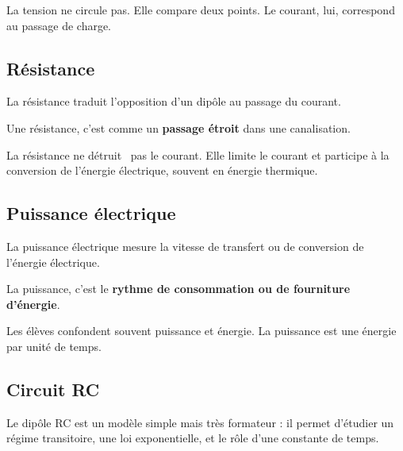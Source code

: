 \documentclass[11pt,a4paper]{article}
\begin{document}
\begin{fausseintuition}
La tension ne circule pas.
Elle compare deux points.
Le courant, lui, correspond au passage de charge.
\end{fausseintuition}

\subsection{Résistance}

\begin{sens}
La résistance traduit l'opposition d'un dipôle au passage du courant.
\end{sens}

\begin{imagem}
Une résistance, c'est comme un \textbf{passage étroit} dans une canalisation.
\end{imagem}

\begin{fausseintuition}
La résistance ne \og détruit \fg\ pas le courant.
Elle limite le courant et participe à la conversion de l'énergie électrique, souvent en énergie thermique.
\end{fausseintuition}

\subsection{Puissance électrique}

\begin{sens}
La puissance électrique mesure la vitesse de transfert ou de conversion de l'énergie électrique.
\end{sens}

\begin{imagem}
La puissance, c'est le \textbf{rythme de consommation ou de fourniture d'énergie}.
\end{imagem}

\begin{fausseintuition}
Les élèves confondent souvent puissance et énergie.
La puissance est une énergie par unité de temps.
\end{fausseintuition}

\subsection{Circuit RC}

\begin{modele}
Le dipôle RC est un modèle simple mais très formateur :
il permet d'étudier un régime transitoire, une loi exponentielle,
et le rôle d'une constante de temps.
\end{modele}
\end{document}
